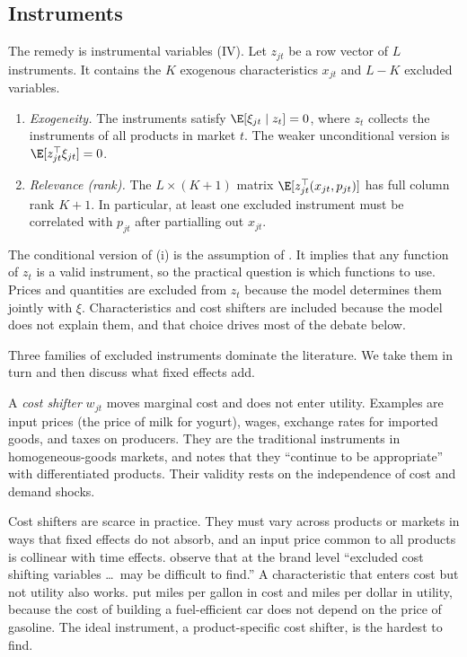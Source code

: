 \subsection{Instruments}\label{sec:07-instruments}

The remedy is instrumental variables (IV). Let $z_{jt}$ be a row vector of $L$ instruments. It contains the $K$ exogenous
characteristics $x_{jt}$ and $L - K$ excluded variables.

\begin{assumption}\label{asm:07-iv}
\leavevmode
\begin{enumerate}[label=(\roman*)]
  \item \emph{Exogeneity.} The instruments satisfy $\E[\xi_{jt} \mid z_t] = 0$, where $z_t$ collects the instruments
    of all products in market $t$. The weaker unconditional version is $\E[z_{jt}^\top\xi_{jt}] = 0$.
  \item \emph{Relevance (rank).} The $L \times (K+1)$ matrix $\E[z_{jt}^\top (x_{jt}, p_{jt})]$ has full column rank
    $K + 1$. In particular, at least one excluded instrument must be correlated with $p_{jt}$ after partialling out
    $x_{jt}$.
\end{enumerate}
\end{assumption}

The conditional version of (i) is the assumption of \citet[eq.~4.1]{BerryLevinsohnPakes1995}. It implies that any
function of $z_t$ is a valid instrument, so the practical question is which functions to use. Prices and quantities
are excluded from $z_t$ because the model determines them jointly with $\xi$. Characteristics and cost shifters are
included because the model does not explain them, and that choice drives most of the debate below.

Three families of excluded instruments dominate the literature. We take them in turn and then discuss what fixed
effects add.

A \emph{cost shifter} $w_{jt}$ moves marginal cost and does not enter utility. Examples are input prices (the price
of milk for yogurt), wages, exchange rates for imported goods, and taxes on producers. They are the traditional
instruments in homogeneous-goods markets, and \citet[p.~249]{Berry1994} notes that they ``continue to be
appropriate'' with differentiated products. Their validity rests on the independence of cost and demand shocks.

Cost shifters are scarce in practice. They must vary across products or markets in ways that fixed effects do not
absorb, and an input price common to all products is collinear with time effects.
\citet[pp.~161, 164]{HausmanLeonardZona1994} observe that at the brand level ``excluded cost shifting variables
\dots\ may be difficult to find.'' A characteristic that enters cost but not utility also works.
\citet[p.~874]{BerryLevinsohnPakes1995} put miles per gallon in cost and miles per dollar in utility, because the cost
of building a fuel-efficient car does not depend on the price of gasoline. The ideal instrument, a product-specific
cost shifter, is the hardest to find.

